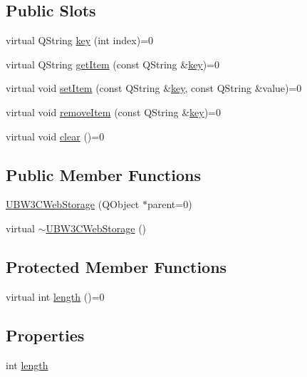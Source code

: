 \subsection*{Public Slots}
\begin{DoxyCompactItemize}
\item 
virtual Q\-String \hyperlink{class_u_b_w3_c_web_storage_a35fc8645e01d34323ebf517763bd25fb}{key} (int index)=0
\item 
virtual Q\-String \hyperlink{class_u_b_w3_c_web_storage_a51cfa0ab747203768dd3ff7108414267}{get\-Item} (const Q\-String \&\hyperlink{class_u_b_w3_c_web_storage_a35fc8645e01d34323ebf517763bd25fb}{key})=0
\item 
virtual void \hyperlink{class_u_b_w3_c_web_storage_a498d084780d66c170b6e8ab2818fa33b}{set\-Item} (const Q\-String \&\hyperlink{class_u_b_w3_c_web_storage_a35fc8645e01d34323ebf517763bd25fb}{key}, const Q\-String \&value)=0
\item 
virtual void \hyperlink{class_u_b_w3_c_web_storage_ae0e1dbd384ba95af533b70de39dc1963}{remove\-Item} (const Q\-String \&\hyperlink{class_u_b_w3_c_web_storage_a35fc8645e01d34323ebf517763bd25fb}{key})=0
\item 
virtual void \hyperlink{class_u_b_w3_c_web_storage_af76eda6418d968e356b1aca69c8bddda}{clear} ()=0
\end{DoxyCompactItemize}
\subsection*{Public Member Functions}
\begin{DoxyCompactItemize}
\item 
\hyperlink{class_u_b_w3_c_web_storage_a5d9c9b2b3cac134b3a8da735da91e73e}{U\-B\-W3\-C\-Web\-Storage} (Q\-Object $\ast$parent=0)
\item 
virtual \hyperlink{class_u_b_w3_c_web_storage_ab7c09da8148f4ee09e3e48532ae762d9}{$\sim$\-U\-B\-W3\-C\-Web\-Storage} ()
\end{DoxyCompactItemize}
\subsection*{Protected Member Functions}
\begin{DoxyCompactItemize}
\item 
virtual int \hyperlink{class_u_b_w3_c_web_storage_ad49a3b5a204e128457bac7c6620d3ecd}{length} ()=0
\end{DoxyCompactItemize}
\subsection*{Properties}
\begin{DoxyCompactItemize}
\item 
int \hyperlink{class_u_b_w3_c_web_storage_a4bcb42e43fb0829c80d1fa683a9517ea}{length}
\end{DoxyCompactItemize}


